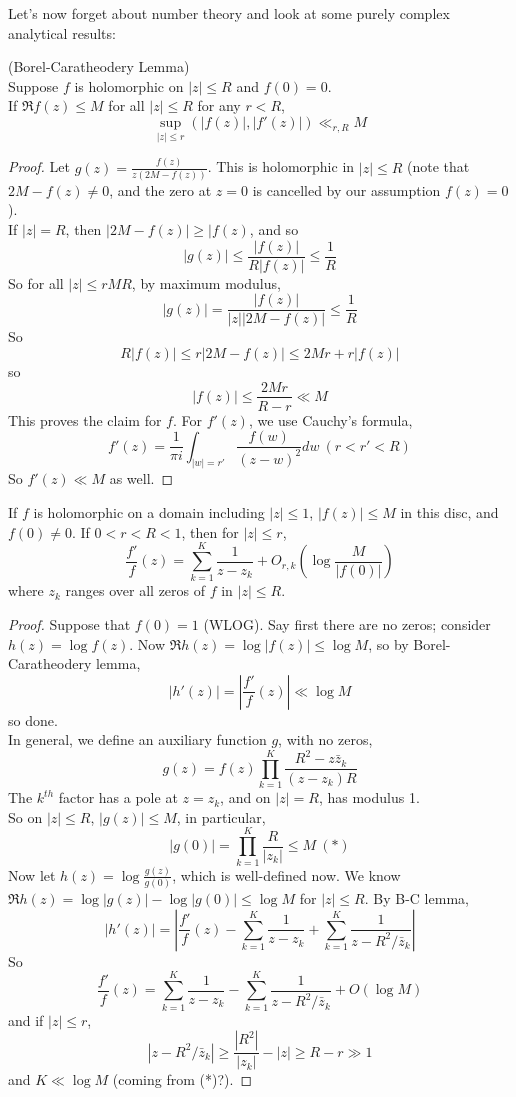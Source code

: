 \documentclass[a4paper]{article}
\begin{document}
Let's now forget about number theory and look at some purely complex analytical results:
\begin{lemma} (Borel-Caratheodery Lemma)\\
Suppose $f$ is holomorphic on $|z| \leq R$ and $f(0) = 0$.\\
If $\Re f(z) \leq M$ for all $|z| \leq R$ for any $r < R$,
\[
\sup_{|z| \leq r} (|f(z)|,|f'(z)|) \ll_{r,R} M
\]
\begin{proof}
Let $g(z) = \frac{f(z)}{z(2M-f(z))}$. This is holomorphic in $|z| \leq R$ (note that $2M-f(z) \neq 0$, and the zero at $z=0$ is cancelled by our assumption $f(z) = 0$).\\
If $|z| = R$, then $|2M-f(z)| \geq |f(z)$, and so 
\[
|g(z)| \leq \frac{|f(z)|}{R|f(z)|} \leq \frac{1}{R}
\]
So for all $|z| \leq r M R$, by maximum modulus,
\[
|g(z)| = \frac{|f(z)|}{|z||2M-f(z)|} \leq \frac{1}{R}
\]
So
\[
R|f(z)| \leq r|2M-f(z)| \leq 2Mr+r|f(z)|
\]
so
\[
|f(z)| \leq \frac{2Mr}{R-r} \ll M
\]
This proves the claim for $f$. For $f'(z)$, we use Cauchy's formula,
\[
f'(z) = \frac{1}{\pi i} \int_{|w|=r'} \frac{f(w)}{(z-w)^2} dw \ (r < r' < R)
\]
So $f'(z) \ll M$ as well.
\end{proof}
\end{lemma}

\begin{lemma}
If $f$ is holomorphic on a domain including $|z| \leq 1$, $|f(z)| \leq M$ in this disc, and $f(0) \neq 0$. If $0<r<R<1$, then for $|z| \leq r$,
\[
\frac{f'}{f}(z) = \sum_{k=1}^K \frac{1}{z-z_k} + O_{r,k}(\log \frac{M}{|f(0)|})
\]
where $z_k$ ranges over all zeros of $f$ in $|z| \leq R$.
\begin{proof}
Suppose that $f(0) = 1$ (WLOG). Say first there are no zeros; consider $h(z) = \log f(z)$. Now $\Re h(z) = \log |f(z)| \leq \log M$, so by Borel-Caratheodery lemma,
\[
|h'(z)| = |\frac{f'}{f}(z)| \ll \log M
\]
so done.\\
In general, we define an auxiliary function $g$, with no zeros,
\[
g(z) = f(z) \prod_{k=1}^K \frac{R^2 - z\bar{z}_k}{(z-z_k)R}
\]
The $k^{th}$ factor has a pole at $z=z_k$, and on $|z|=R$, has modulus 1.\\
So on $|z| \leq R$, $|g(z)| \leq M$, in particular, 
\[
|g(0)| = \prod_{k=1}^K \frac{R}{|z_k|} \leq M \ (*)
\]
Now let $h(z) = \log \frac{g(z)}{g(0)}$, which is well-defined now. We know $\Re h(z) = \log |g(z)| - \log |g(0)| \leq \log M$ for $|z| \leq R$. By B-C lemma,
\[
|h'(z)| = \left|\frac{f'}{f}(z) - \sum_{k=1}^K \frac{1}{z-z_k} + \sum_{k=1}^K \frac{1}{z-R^2/\bar{z}_k}\right|
\]
So
\[
\frac{f'}{f}(z) = \sum_{k=1}^K \frac{1}{z-z_k} - \sum_{k=1}^K \frac{1}{z-R^2/\bar{z}_k} + O(\log M)
\]
and if $|z| \leq r$,
\[
|z-R^2/\bar{z}_k| \geq \frac{|R^2|}{|z_k|} - |z| \geq R-r \gg 1
\]
and $K \ll \log M$ (coming from (*)?).
\end{proof}
\end{lemma}
\end{document}
